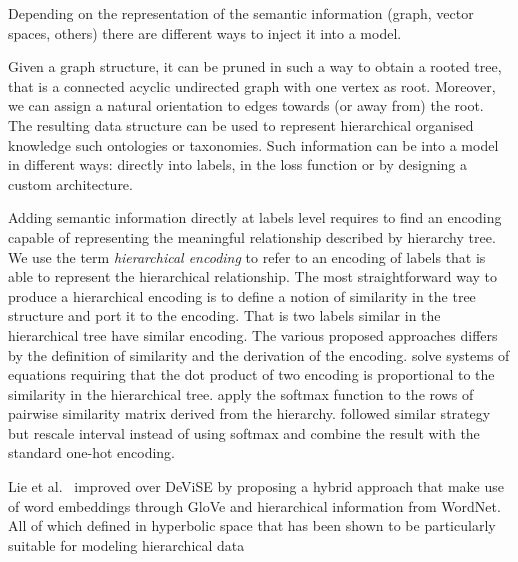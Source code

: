 
Depending on the representation of the semantic information (graph, vector
spaces, others) there are different ways to inject it into a model.

Given a graph structure, it can be pruned in such a way to obtain a rooted
tree, that is a connected acyclic undirected graph with one vertex as root.
Moreover, we can assign a natural orientation to edges towards (or away from)
the root. The resulting data structure can be used to represent hierarchical
organised knowledge such ontologies or taxonomies. Such information can be into
a model in different ways: directly into labels, in the loss function or by
designing a custom architecture.

Adding semantic information directly at labels level requires to find an
encoding capable of representing the meaningful relationship described by
hierarchy tree. We use the term \emph{hierarchical encoding} to refer to
an encoding of labels that is able to represent the hierarchical relationship.
The most straightforward way to produce a hierarchical encoding is to define a
notion of similarity in the tree structure and port it to the encoding. That is
two labels similar in the hierarchical tree have similar encoding. The various
proposed approaches differs by the definition of similarity and the derivation
of the encoding. \cite{HierarchyBasedBarz2018} solve systems of equations
requiring that the dot product of two encoding is proportional to the
similarity in the hierarchical tree. \cite{MakingBetterMBertin2019} apply the
softmax function to the rows of pairwise similarity matrix derived from the
hierarchy. \cite{BeyondOneHotPerott2023} followed similar strategy but
rescale interval instead of using softmax and combine the result with the
standard one-hot encoding.



Lie et al.~\cite{HyperbolicVisuLiuS2020} improved over DeViSE by proposing a
hybrid approach that make use of word embeddings through GloVe and hierarchical
information from WordNet. All of which defined in hyperbolic space that has
been shown to be particularly suitable for modeling hierarchical
data\cite{PoincareEmbeddNickel2017, HyperbolicEntaGanea2018}

